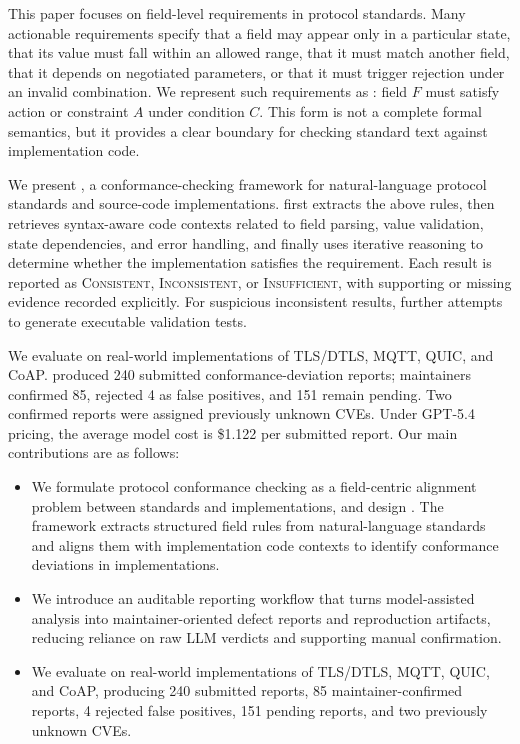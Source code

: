 This paper focuses on field-level requirements in protocol standards. Many actionable
requirements specify that a field may appear only in a particular state, that
its value must fall within an allowed range, that it must match another field,
that it depends on negotiated parameters, or that it must trigger rejection
under an invalid combination. We represent such requirements as :
field $F$ must satisfy action or constraint $A$ under condition $C$. This form
is not a complete formal semantics, but it provides a clear boundary for
checking standard text against implementation code.

We present \tool{}, a conformance-checking framework for natural-language
protocol standards and source-code implementations. \tool{} first extracts the
above rules, then retrieves syntax-aware code contexts related to field
parsing, value validation, state dependencies, and error handling, and finally
uses iterative reasoning to determine whether the implementation satisfies the
requirement. Each result is reported as \textsc{Consistent},
\textsc{Inconsistent}, or \textsc{Insufficient}, with supporting or missing
evidence recorded explicitly. For suspicious inconsistent results, \tool{}
further attempts to generate executable validation tests.

We evaluate \tool{} on real-world implementations of TLS/DTLS, MQTT, QUIC, and
CoAP. \tool{} produced 240 submitted conformance-deviation reports; maintainers
confirmed 85, rejected 4 as false positives, and 151 remain pending.
Two confirmed reports were assigned previously unknown CVEs. Under GPT-5.4
pricing, the average model cost is \$1.122 per submitted report. 
Our main contributions are as follows:

\begin{itemize}[leftmargin=*]
  \item We formulate protocol conformance checking as a field-centric alignment
  problem between standards and implementations, and design \tool{}. The
  framework extracts structured field rules from natural-language standards and
  aligns them with implementation code contexts to identify conformance
  deviations in implementations.

  \item We introduce an auditable reporting workflow that turns model-assisted
  analysis into maintainer-oriented defect reports and reproduction
  artifacts, reducing reliance on raw LLM verdicts and supporting manual
  confirmation.

  \item We evaluate \tool{} on real-world implementations of TLS/DTLS, MQTT,
  QUIC, and CoAP, producing 240 submitted reports, 85 maintainer-confirmed
  reports, 4 rejected false positives, 151 pending reports, and two
  previously unknown CVEs.
\end{itemize}
